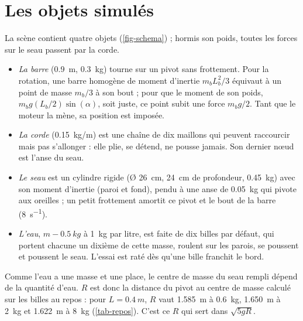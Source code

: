 
\section{Les objets simulés}

La scène contient quatre objets (\cref{fig-schema}) ; hormis son poids, toutes
les forces sur le seau passent par la corde.
\begin{itemize}
  \item \emph{La barre} (\SI{0,9}{m}, \SI{0,3}{kg}) tourne sur un pivot sans
        frottement. Pour la rotation, une barre homogène de moment d'inertie
        \(m_b L_b^2/3\) équivaut à un point de masse \(m_b/3\) à son bout ; pour
        que le moment de son poids, \(m_b g (L_b/2) \sin(\alpha)\), soit juste,
        ce point subit une force \(m_b g/2\). Tant que le moteur la mène, sa
        position est imposée.
  \item \emph{La corde} (\SI{0,15}{kg/m}) est une chaîne de dix maillons qui
        peuvent raccourcir mais pas s'allonger : elle plie, se détend, ne pousse
        jamais. Son dernier nœud est l'anse du seau.
  \item \emph{Le seau} est un cylindre rigide (Ø \SI{26}{cm}, \SI{24}{cm} de
        profondeur, \SI{0,45}{kg}) avec son moment d'inertie (paroi et fond),
        pendu à une anse de \SI{0,05}{kg} qui pivote aux oreilles ; un petit
        frottement amortit ce pivot et le bout de la barre (\SI{8}{s^{-1}}).
  \item \emph{L'eau}, \(m - \SI{0,5}{kg}\) à \SI{1}{kg} par litre, est faite de
        dix billes par défaut, qui portent chacune un dixième de cette masse,
        roulent sur les parois, se poussent et poussent le seau. L'essai est
        raté dès qu'une bille franchit le bord.
\end{itemize}
Comme l'eau a une masse et une place, le centre de masse du seau rempli dépend
de la quantité d'eau. \(R\) est donc la distance du pivot au centre de masse
calculé sur les billes au repos : pour \(L = \SI{0,4}{m}\), \(R\) vaut \SI{1,585}{m} à \SI{0,6}{kg},
\SI{1,650}{m} à \SI{2}{kg} et \SI{1,622}{m} à \SI{8}{kg}
(\cref{tab-repos}). C'est ce \(R\) qui sert dans \(\sqrt{5 g R}\).

